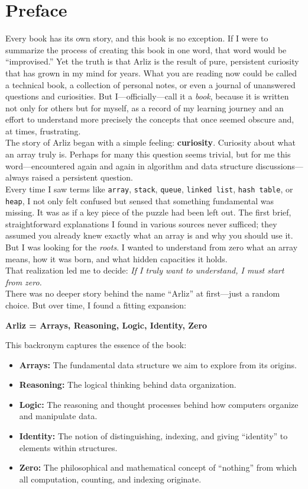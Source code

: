 \chapter{Preface}

Every book has its own story, and this book is no exception. If I were to summarize the process of creating this book in one word, that word would be “improvised.” Yet the truth is that Arliz is the result of pure, persistent curiosity that has grown in my mind for years. What you are reading now could be called a technical book, a collection of personal notes, or even a journal of unanswered questions and curiosities. But I—officially—call it a \emph{book}, because it is written not only for others but for myself, as a record of my learning journey and an effort to understand more precisely the concepts that once seemed obscure and, at times, frustrating.\\
The story of Arliz began with a simple feeling: \textbf{curiosity}.  
Curiosity about what an array truly is. Perhaps for many this question seems trivial, but for me this word—encountered again and again in algorithm and data structure discussions—always raised a persistent question.\\
Every time I saw terms like \texttt{array}, \texttt{stack}, \texttt{queue}, \texttt{linked list}, \texttt{hash table}, or \texttt{heap}, I not only felt confused but sensed that something fundamental was missing. It was as if a key piece of the puzzle had been left out. The first brief, straightforward explanations I found in various sources never sufficed; they assumed you already knew exactly what an array is and why you should use it. But I was looking for the \emph{roots}. I wanted to understand from zero what an array means, how it was born, and what hidden capacities it holds.\\
That realization led me to decide:  
\emph{If I truly want to understand, I must start from zero.}\\	
There was no deeper story behind the name “Arliz” at first—just a random choice. But over time, I found a fitting expansion:
\begin{center}
	\textbf{Arliz = Arrays, Reasoning, Logic, Identity, Zero}
\end{center}
This backronym captures the essence of the book:
\begin{itemize}
	\item \textbf{Arrays:} The fundamental data structure we aim to explore from its origins.
	\item \textbf{Reasoning:}  The logical thinking behind data organization.
	\item \textbf{Logic:} The reasoning and thought processes behind how computers organize and manipulate data.
	\item \textbf{Identity:} The notion of distinguishing, indexing, and giving “identity” to elements within structures.
	\item \textbf{Zero:} The philosophical and mathematical concept of “nothing” from which all computation, counting, and indexing originate.
\end{itemize}
